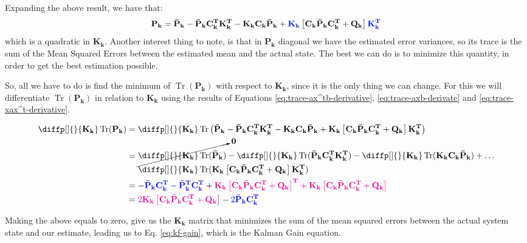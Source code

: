 \documentclass[12pt]{article}
\newcommand{\mat}[1]{\boldsymbol{\mathbf{#1}}}
\newcommand{\matT}[1]{\boldsymbol{\mathbf{#1^T}}}
\newcommand{\brac}[1]{\left[#1\right]} %
\newcommand{\parentheses}[1]{\left(#1\right)}
\DeclareMathOperator{\Tr}{Tr}
\newcommand{\blue}[1]{\color{blue}#1\color{black}}
\newcommand{\magenta}[1]{\color{magenta}#1\color{black}}
\begin{document}
Expanding the above result, we have that:
\begin{equation*}
    \mat{P_k} = \mat{\bar{P}_k} - \mat{\bar{P}_k}\matT{C_k}\matT{K_k} - \mat{K_k C_k \bar{P}_k} +  \blue{\mat{K_k}}\brac{\mat{C_k}\mat{\bar{P}_k}\matT{C_k} + \mat{Q_k}}\blue{\matT{K_k}}
\end{equation*}
which is a quadratic in $\mat{K_k}$. Another interest thing to note, is that in $\mat{P_k}$ diagonal we have the estimated error variances, so its trace is the sum of the Mean Squared Errors between the estimated mean and the actual state. The best we can do is to minimize this quantity, in order to get the best estimation possible. 

So, all we have to do is find the minimum of $\Tr(\mat{P_k})$ with respect to $\mat{K_k}$, since it is the only thing we can change. For this we will differentiate $\Tr(\mat{P_k})$ in relation to $\mat{K_k}$ using the results of Equations \ref{eq:trace-ax^tb-derivative}, \ref{eq:trace-axb-derivate} and \ref{eq:trace-xax^t-derivative}.

\begin{equation*}
   \begin{aligned}
       \diffp[]{}{\mat{K_k}}\Tr(\mat{P_k}) &= \diffp[]{}{\mat{K_k}} \Tr\parentheses{\mat{\bar{P}_k} - \mat{\bar{P}_k}\matT{C_k}\matT{K_k} - \mat{K_k C_k \bar{P}_k} +  \mat{K_k}\brac{\mat{C_k}\mat{\bar{P}_k}\matT{C_k} + \mat{Q_k}}\matT{K_k}}\\
       &= \begin{aligned}
       &\cancelto{\mat{0}}{\diffp[]{}{\mat{K_k}} \Tr(\mat{\bar{P}_k})} - \diffp[]{}{\mat{K_k}}\Tr(\mat{\bar{P}_k}\matT{C_k}\matT{K_k}) - \diffp[]{}{\mat{K_k}}\Tr(\mat{K_k C_k \bar{P}_k}) + \dots\\ &\diffp[]{}{\mat{K_k}}\Tr(\mat{K_k}\brac{\mat{C_k}\mat{\bar{P}_k}\matT{C_k} + \mat{Q_k}}\matT{K_k})
       \end{aligned}\\
       &= -\blue{\mat{\bar{P}_k}\matT{C_k} - \matT{\bar{P}_k}\matT{C_k}} + \magenta{\mat{K_k}\brac{\mat{C_k}\mat{\bar{P}_k}\matT{C_k} + \mat{Q_k}}^\mathbf{T} + \mat{K_k}\brac{\mat{C_k}\mat{\bar{P}_k}\matT{C_k} + \mat{Q_k}}}\\
       &= \magenta{2 \mat{K_k}\brac{\mat{C_k}\mat{\bar{P}_k}\matT{C_k} + \mat{Q_k}}} - \blue{2 \mat{\bar{P}_k}\matT{C_k}}
   \end{aligned} 
\end{equation*}

Making the above equals to zero, give us the $\mat{K_k}$ matrix that minimizes the sum of the mean squared errors between the actual system state and our estimate, leading us to Eq. \ref{eq:kf-gain}, which is the Kalman Gain equation.
\end{document}
